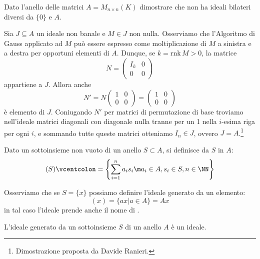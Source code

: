 \documentclass[11pt]{scrartcl}
\begin{document}
\begin{exercise}
    Dato l'anello delle matrici $A = M_{n \times n}(K)$ dimostrare che non ha ideali bilateri diversi da $\{0\}$ e $A$.
\end{exercise}

\begin{soln}
Sia $J\subseteq A$ un ideale non banale e $M\in J$ non nulla. Osserviamo che l'Algoritmo di Gauss applicato ad $M$ può essere espresso come moltiplicazione di $M$
a sinistra e a destra per opportuni elementi di $A$. Dunque, se $k=\mathrm{rnk}\, M>0$, la matrice 
\[ N=\left(\begin{array}{c|c}
    I_k & 0\\
    \hline
    0 & 0
\end{array}\right)
    \]
appartiene a $J$. Allora anche
\[
    N'=N\left(\begin{array}{c|c}
        1 & 0 \\
        \hline
        0 & 0
    \end{array}\right)
=\left(\begin{array}{c|c}
    1 & 0 \\
    \hline
    0 & 0
\end{array}\right)\]
è elemento di $J$. Coniugando $N'$ per matrici di permutazione di base troviamo nell'ideale matrici diagonali con diagonale nulla tranne per un 1
nella $i$-esima riga per ogni $i$, e sommando tutte queste matrici otteniamo $I_n\in J$, ovvero $J=A$.\footnote{Dimostrazione proposta da Davide Ranieri.}
\end{soln}

\begin{definition}
    Dato un sottoinsieme non vuoto di un anello $S \subset A$, si definisce  da $S$ in $A$:
        \[ (S) \vcentcolon =  \left\{\sum_{i = 1}^{n}a_is_i \m a_i \in A, s_i \in S, n \in \NN\right\}
            \]
\end{definition}

Osserviamo che se $S = \{x\}$ possiamo definire l'ideale generato da un elemento:
        \[ (x) = \{ax | a \in A\} = Ax
            \]
in tal caso l'ideale prende anche il nome di .
        
\begin{proposition}
    L'ideale generato da un sottoinsieme $S$ di un anello $A$ è un ideale.
\end{proposition}
\end{document}
